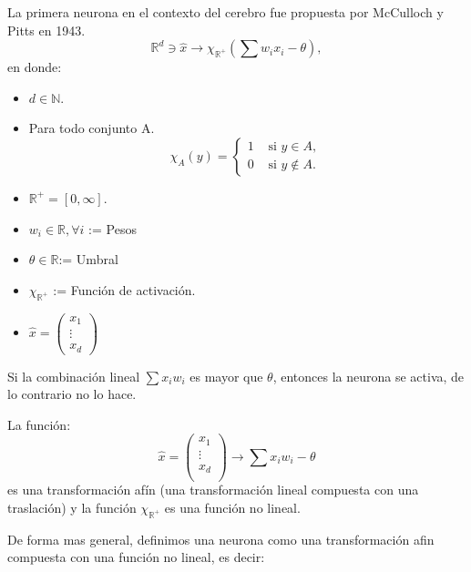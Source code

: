 \documentclass[12pt,a4paper]{book}
\begin{document}
La primera neurona en el contexto del cerebro fue propuesta por McCulloch y Pitts en 1943.
\begin{equation}\label{eq:McCulloch-Pitts}
\mathbb{R}^{d}\ni \widehat{x}\rightarrow \chi_{\mathbb{R}^{+}}\left(\sum w_{i}x_{i}-\theta\right),
\end{equation}
en donde:
\begin{itemize}
\item $d\in\mathbb{N}$.
\item Para todo conjunto A.
\begin{equation*}
 \chi_{A}(y)=
\begin{cases}
1 & \text{ si $y\in A$, }\\ 
0 & \text{ si $y\not\in A$. }  
\end{cases}
\end{equation*}
\item $\mathbb{R}^{+}=[0,\infty]$.
\item $w_{i}\in\mathbb{R}, \forall i$ := Pesos
\item $\theta\in\mathbb{R}$:= Umbral
\item $\chi_{\mathbb{R}^{+}}$ := Función de activación.
\item $\widehat{x}=\begin{pmatrix}
x_{1} \\ 
\vdots \\ 
x_{d}
\end{pmatrix}$
\end{itemize}
Si la combinación lineal $\sum x_{i}w_{i}$ es mayor que $\theta$, entonces la neurona se activa, de lo contrario no lo hace.

La función:
\begin{equation}
\widehat{x}=
\begin{pmatrix}
x_{1} \\ 
\vdots \\ 
x_{d} \\ 
\end{pmatrix}
\rightarrow \sum x_{i}w_{i}-\theta     
\end{equation}
es una transformación afín (una transformación lineal compuesta con una traslación) y la función $\chi_{\mathbb{R}^{+}}$ es una función no lineal.

De forma mas general, definimos una neurona como una transformación afin compuesta con una función no lineal, es decir:
\end{document}
